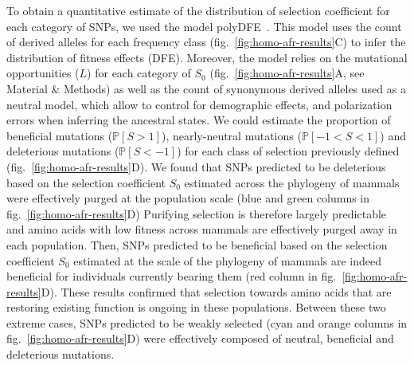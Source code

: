 \documentclass{article}
\newcommand{\proba}{\mathbb{P}}
\newcommand{\Sphy}{S_{0}}
\newcommand{\Spop}{S}
\newcommand{\polyDel}{\Spop < -1}
\newcommand{\polyNeutral}{-1 < \Spop < 1}
\newcommand{\polyAdv}{ \Spop > 1}
\newcommand{\PpolyDel}{\proba \left[ \polyDel \right]}
\newcommand{\PpolyNeutral}{\proba \left[ \polyNeutral \right]}
\newcommand{\PpolyAdv}{\proba \left[ \polyAdv \right]}
\begin{document}
    To obtain a quantitative estimate of the distribution of selection coefficient for each category of SNPs, we used the model polyDFE~\cite{tataru_inference_2017, tataru_polydfe_2020}.
    This model uses the count of derived alleles for each frequency class (fig.~\ref{fig:homo-afr-results}C) to infer the distribution of fitness effects (DFE).
    Moreover, the model relies on the mutational opportunities ($L$) for each category of $\Sphy$ (fig.~\ref{fig:homo-afr-results}A, see Material \& Methods) as well as the count of synonymous derived alleles used as a neutral model, which allow to control for demographic effects, and polarization errors when inferring the ancestral states.
    We could estimate the proportion of beneficial mutations ($\PpolyAdv$), nearly-neutral mutations ($\PpolyNeutral$) and deleterious mutations ($\PpolyDel$) for each class of selection previously defined (fig.~\ref{fig:homo-afr-results}D).
    We found that SNPs predicted to be deleterious based on the selection coefficient $\Sphy$ estimated across the phylogeny of mammals were effectively purged at the population scale (blue and green columns in fig.~\ref{fig:homo-afr-results}D)
    Purifying selection is therefore largely predictable and amino acids with low fitness across mammals are effectively purged away in each population.
    Then, SNPs predicted to be beneficial based on the selection coefficient $\Sphy$ estimated at the scale of the phylogeny of mammals are indeed beneficial for individuals currently bearing them (red column in fig.~\ref{fig:homo-afr-results}D).
    These results confirmed that selection towards amino acids that are restoring existing function is ongoing in these populations.
    Between these two extreme cases, SNPs predicted to be weakly selected (cyan and orange columns in fig.~\ref{fig:homo-afr-results}D) were effectively composed of neutral, beneficial and deleterious mutations.
\end{document}
